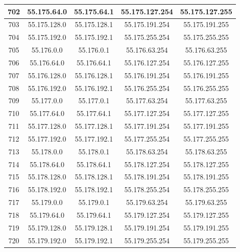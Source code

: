\documentclass[letterpaper,12pt]{article}
\begin{document}
\begin{center}
\begin{longtable}{|c|c|c|c|c|}
                702 & 55.175.64.0 & 55.175.64.1 & 55.175.127.254 & 55.175.127.255 \\ \hline
                703 & 55.175.128.0 & 55.175.128.1 & 55.175.191.254 & 55.175.191.255 \\ \hline
                704 & 55.175.192.0 & 55.175.192.1 & 55.175.255.254 & 55.175.255.255 \\ \hline
                705 & 55.176.0.0 & 55.176.0.1 & 55.176.63.254 & 55.176.63.255 \\ \hline
                706 & 55.176.64.0 & 55.176.64.1 & 55.176.127.254 & 55.176.127.255 \\ \hline
                707 & 55.176.128.0 & 55.176.128.1 & 55.176.191.254 & 55.176.191.255 \\ \hline
                708 & 55.176.192.0 & 55.176.192.1 & 55.176.255.254 & 55.176.255.255 \\ \hline
                709 & 55.177.0.0 & 55.177.0.1 & 55.177.63.254 & 55.177.63.255 \\ \hline
                710 & 55.177.64.0 & 55.177.64.1 & 55.177.127.254 & 55.177.127.255 \\ \hline
                711 & 55.177.128.0 & 55.177.128.1 & 55.177.191.254 & 55.177.191.255 \\ \hline
                712 & 55.177.192.0 & 55.177.192.1 & 55.177.255.254 & 55.177.255.255 \\ \hline
                713 & 55.178.0.0 & 55.178.0.1 & 55.178.63.254 & 55.178.63.255 \\ \hline
                714 & 55.178.64.0 & 55.178.64.1 & 55.178.127.254 & 55.178.127.255 \\ \hline
                715 & 55.178.128.0 & 55.178.128.1 & 55.178.191.254 & 55.178.191.255 \\ \hline
                716 & 55.178.192.0 & 55.178.192.1 & 55.178.255.254 & 55.178.255.255 \\ \hline
                717 & 55.179.0.0 & 55.179.0.1 & 55.179.63.254 & 55.179.63.255 \\ \hline
                718 & 55.179.64.0 & 55.179.64.1 & 55.179.127.254 & 55.179.127.255 \\ \hline
                719 & 55.179.128.0 & 55.179.128.1 & 55.179.191.254 & 55.179.191.255 \\ \hline
                720 & 55.179.192.0 & 55.179.192.1 & 55.179.255.254 & 55.179.255.255 \\ \hline
        \end{longtable}
    \end{center}
\end{document}
